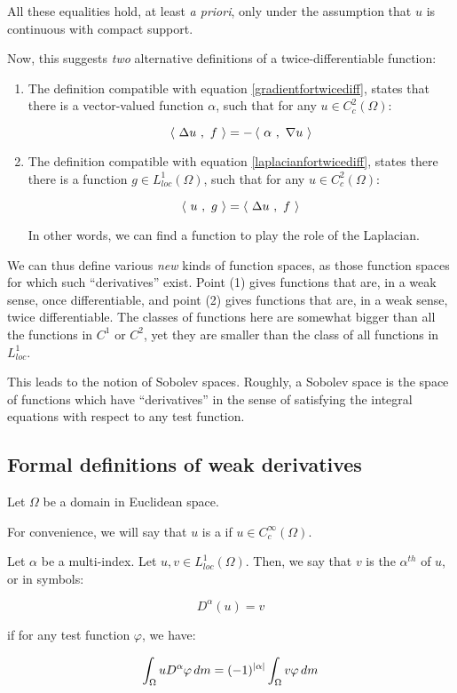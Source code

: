 \documentclass[a4paper]{amsart}
\begin{document}
All these equalities hold, at least {\em a priori}, only under the
assumption that $u$ is continuous with compact support.

Now, this suggests {\em two} alternative definitions of a
twice-differentiable function:

\begin{enumerate}

\item The definition compatible with equation
  \ref{gradientfortwicediff}, states that there is a vector-valued
  function $\alpha$, such that for any $u \in C_c^2(\Omega)$:
  
  $$\left< \ \Delta u \ , \ f \ \right> = -\left< \ \alpha \ , \ \nabla u \ \right>$$

\item The definition compatible with equation
  \ref{laplacianfortwicediff}, states there there is a function $g \in
  L^1_{loc}(\Omega)$, such that for any $u \in C_c^2(\Omega)$:

  $$\left< \ u \ , \ g \ \right> = \left< \ \Delta u \ , \ f \ \right>$$

  In other words, we can find a function to play the role of the Laplacian.

\end{enumerate}

We can thus define various {\em new} kinds of function spaces, as
those function spaces for which such ``derivatives'' exist. Point (1)
gives functions that are, in a weak sense, once differentiable, and
point (2) gives functions that are, in a weak sense, twice
differentiable. The classes of functions here are somewhat bigger than
all the functions in $C^1$ or $C^2$, yet they are smaller than the
class of all functions in $L^1_{loc}$.

This leads to the notion of Sobolev spaces. Roughly, a Sobolev space
is the space of functions which have ``derivatives'' in the sense of
satisfying the integral equations with respect to any test function.

\subsection{Formal definitions of weak derivatives}

Let $\Omega$ be a domain in Euclidean space.

For convenience, we will say that $u$ is a 
if $u \in C_c^\infty(\Omega)$.

\begin{definer}
  Let $\alpha$ be a multi-index. Let $u,v \in
  L^1_{loc}(\Omega)$. Then, we say that $v$ is the $\alpha^{th}$
   of $u$, or in symbols:

  $$D^\alpha(u) = v$$

  if for any test function $\varphi$, we have:

  $$\int_\Omega uD^\alpha \varphi \, dm = (-1)^{\left|\alpha\right|} \int_\Omega v \varphi \, dm $$
\end{definer}
\end{document}
